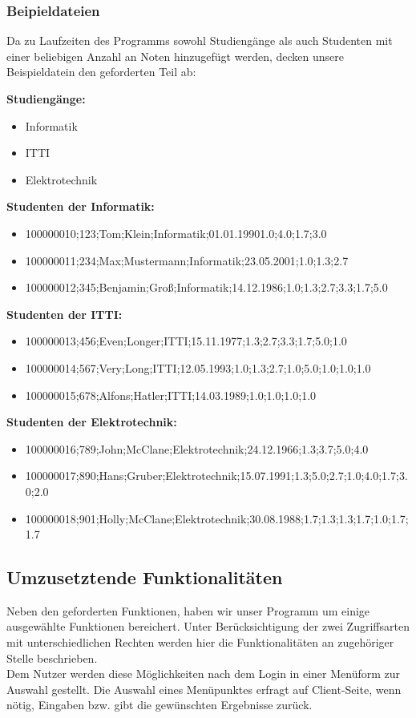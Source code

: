 \documentclass{scrartcl}
\begin{document}
\newpage
		
		\subsubsection{Beipieldateien}
			Da zu Laufzeiten des Programms sowohl Studiengänge als auch Studenten mit einer beliebigen Anzahl an Noten hinzugefügt werden, decken unsere Beispieldatein den geforderten Teil ab:
			
			\textbf{Studiengänge:}
			\begin{itemize}
				\item Informatik
				\item ITTI
				\item Elektrotechnik
			\end{itemize}
			
			\textbf{Studenten der Informatik:}
			\begin{itemize}
				\item 100000010;123;Tom;Klein;Informatik;01.01.19901.0;4.0;1.7;3.0
				\item 100000011;234;Max;Mustermann;Informatik;23.05.2001;1.0;1.3;2.7
				\item 100000012;345;Benjamin;Groß;Informatik;14.12.1986;1.0;1.3;2.7;3.3;1.7;5.0
			\end{itemize}
			
			\textbf{Studenten der ITTI:}
			\begin{itemize}
				\item 100000013;456;Even;Longer;ITTI;15.11.1977;1.3;2.7;3.3;1.7;5.0;1.0
				\item 100000014;567;Very;Long;ITTI;12.05.1993;1.0;1.3;2.7;1.0;5.0;1.0;1.0;1.0
				\item 100000015;678;Alfons;Hatler;ITTI;14.03.1989;1.0;1.0;1.0;1.0
			\end{itemize}
			
			\textbf{Studenten der Elektrotechnik:}
			\begin{itemize}
				\item 100000016;789;John;McClane;Elektrotechnik;24.12.1966;1.3;3.7;5.0;4.0
				\item 100000017;890;Hans;Gruber;Elektrotechnik;15.07.1991;1.3;5.0;2.7;1.0;4.0;1.7;3.0;2.0
				\item 100000018;901;Holly;McClane;Elektrotechnik;30.08.1988;1.7;1.3;1.3;1.7;1.0;1.7;1.7
			\end{itemize}
		
	\subsection{Umzusetztende Funktionalitäten}
		Neben den geforderten Funktionen, haben wir unser Programm um einige ausgewählte Funktionen bereichert. Unter Berücksichtigung der zwei Zugriffsarten mit unterschiedlichen Rechten werden hier die Funktionalitäten an zugehöriger Stelle beschrieben.\\
		Dem Nutzer werden diese Möglichkeiten nach dem Login in einer Menüform zur Auswahl gestellt. Die Auswahl eines Menüpunktes erfragt auf Client-Seite, wenn nötig, Eingaben bzw. gibt die gewünschten Ergebnisse zurück.
\end{document}
